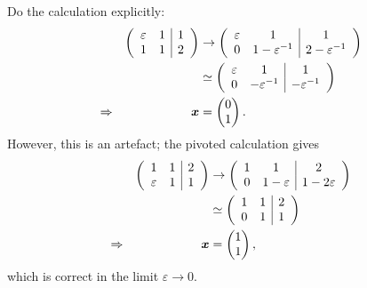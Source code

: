 \documentclass{beamer}
\newcommand{\bx}{{\boldsymbol{x}}}
\begin{document}
\begin{frame}
{  Do the calculation explicitly:
  \begin{align*}
    &&
    \left(
      \begin{array}{c c|c}
        \varepsilon & 1 & 1 \\
        1 & 1 & 2        
      \end{array}
    \right) & \rightarrow
    \left(
      \begin{array}{c c|c}
        \varepsilon & 1 & 1 \\
        0 & 1 - \varepsilon^{-1} & 2 - \varepsilon^{-1}
      \end{array}
    \right) \\
    &&& \simeq
    \left(
      \begin{array}{c c|c}
        \varepsilon & 1 & 1 \\
        0 & - \varepsilon^{-1} & - \varepsilon^{-1}
      \end{array}
    \right) \\
    \Rightarrow&& \bx & =
    \begin{pmatrix}
      0 \\ 1
    \end{pmatrix}.
  \end{align*}
  However, this is an artefact; the pivoted calculation gives
  \begin{align*}
    &&
    \left(
      \begin{array}{c c|c}
        1 & 1 & 2 \\
        \varepsilon & 1 & 1
      \end{array}
    \right) & \rightarrow
    \left(
      \begin{array}{c c|c}
        1 & 1 & 2 \\
        0 & 1 - \varepsilon & 1 - 2 \varepsilon
      \end{array}
    \right) \\
    &&& \simeq
    \left(
      \begin{array}{c c|c}
        1 & 1 & 2 \\
        0 & 1 & 1
      \end{array}
    \right) \\
    \Rightarrow&& \bx & =
    \begin{pmatrix}
      1 \\ 1
    \end{pmatrix},
  \end{align*}
  which is correct in the limit $\varepsilon \rightarrow 0$.
}

\end{frame}
\end{document}
